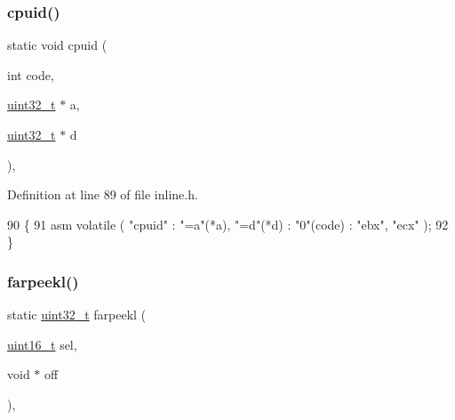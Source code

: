 \subsubsection{\texorpdfstring{cpuid()}{cpuid()}}
{\footnotesize\ttfamily static void cpuid (\begin{DoxyParamCaption}\item[{int}]{code,  }\item[{\hyperlink{a00095_a435d1572bf3f880d55459d9805097f62_a435d1572bf3f880d55459d9805097f62}{uint32\+\_\+t} $\ast$}]{a,  }\item[{\hyperlink{a00095_a435d1572bf3f880d55459d9805097f62_a435d1572bf3f880d55459d9805097f62}{uint32\+\_\+t} $\ast$}]{d }\end{DoxyParamCaption})\hspace{0.3cm}{\ttfamily [inline]}, {\ttfamily [static]}}



Definition at line 89 of file inline.\+h.


\begin{DoxyCode}
90 \{
91     \textcolor{keyword}{asm} \textcolor{keyword}{volatile} ( \textcolor{stringliteral}{"cpuid"} : \textcolor{stringliteral}{"=a"}(*a), \textcolor{stringliteral}{"=d"}(*d) : \textcolor{stringliteral}{"0"}(code) : \textcolor{stringliteral}{"ebx"}, \textcolor{stringliteral}{"ecx"} );
92 \}
\end{DoxyCode}
\mbox{\label{a00104_aee0779a0581136320f91a72c4d6b5b90_aee0779a0581136320f91a72c4d6b5b90}} 
\subsubsection{\texorpdfstring{farpeekl()}{farpeekl()}}
{\footnotesize\ttfamily static \hyperlink{a00095_a435d1572bf3f880d55459d9805097f62_a435d1572bf3f880d55459d9805097f62}{uint32\+\_\+t} farpeekl (\begin{DoxyParamCaption}\item[{\hyperlink{a00095_a273cf69d639a59973b6019625df33e30_a273cf69d639a59973b6019625df33e30}{uint16\+\_\+t}}]{sel,  }\item[{void $\ast$}]{off }\end{DoxyParamCaption})\hspace{0.3cm}{\ttfamily [inline]}, {\ttfamily [static]}}



